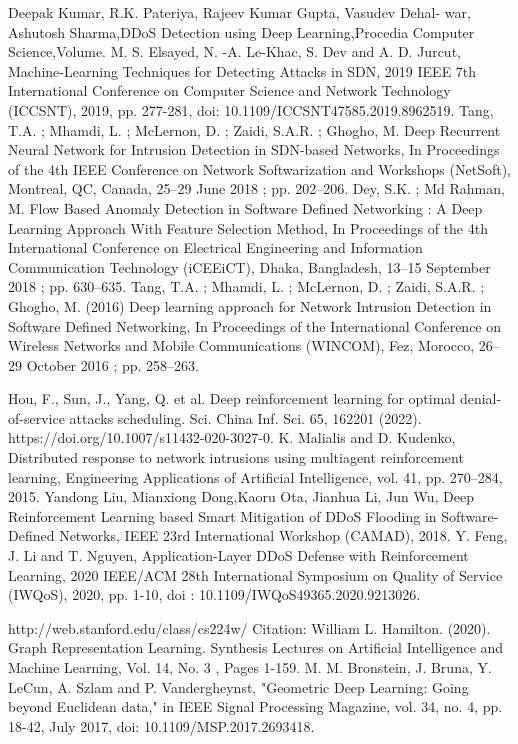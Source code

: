 \begin{thebibliography}{00}
 Deepak Kumar, R.K. Pateriya, Rajeev Kumar Gupta, Vasudev Dehal-
war, Ashutosh Sharma,DDoS Detection using Deep Learning,Procedia
Computer Science,Volume.
M. S. Elsayed, N. -A. Le-Khac, S. Dev and A. D. Jurcut,
Machine-Learning Techniques for Detecting Attacks in SDN, 2019
IEEE 7th International Conference on Computer Science and Network Technology (ICCSNT), 2019, pp. 277-281, doi: 10.1109/ICCSNT47585.2019.8962519.
 Tang, T.A. ; Mhamdi, L. ; McLernon, D. ; Zaidi, S.A.R. ; Ghogho, M. Deep Recurrent Neural Network for Intrusion Detection in
SDN-based Networks, In Proceedings of the 4th IEEE Conference on Network Softwarization and Workshops (NetSoft), Montreal, QC,
Canada, 25–29 June 2018 ; pp. 202–206.
 Dey, S.K. ; Md Rahman, M. Flow Based Anomaly Detection in Software Defined Networking : A Deep Learning Approach With
Feature Selection Method, In Proceedings of the 4th International Conference on Electrical Engineering and Information Communication
Technology (iCEEiCT), Dhaka, Bangladesh, 13–15 September 2018 ; pp. 630–635.
 Tang, T.A. ; Mhamdi, L. ; McLernon, D. ; Zaidi, S.A.R. ; Ghogho, M. (2016) Deep learning approach for Network Intrusion Detection
in Software Defined Networking, In Proceedings of the International Conference on Wireless Networks and Mobile Communications
(WINCOM), Fez, Morocco, 26–29 October 2016 ; pp. 258–263.

Hou, F., Sun, J., Yang, Q. et al. Deep reinforcement learning for optimal denial-of-service attacks scheduling. Sci. China Inf. Sci. 65, 162201 (2022). https://doi.org/10.1007/s11432-020-3027-0.
 K. Malialis and D. Kudenko, Distributed response to network intrusions using multiagent reinforcement learning, Engineering
Applications of Artificial Intelligence, vol. 41, pp. 270–284, 2015.
 Yandong Liu, Mianxiong Dong,Kaoru Ota, Jianhua Li, Jun Wu, Deep Reinforcement Learning based Smart Mitigation of DDoS Flooding
in Software-Defined Networks, IEEE 23rd International Workshop (CAMAD), 2018.
 Y. Feng, J. Li and T. Nguyen, Application-Layer DDoS Defense with Reinforcement Learning, 2020 IEEE/ACM 28th International
Symposium on Quality of Service (IWQoS), 2020, pp. 1-10, doi : 10.1109/IWQoS49365.2020.9213026.



 
http://web.stanford.edu/class/cs224w/
 Citation: William L. Hamilton. (2020). Graph Representation Learning. Synthesis Lectures on Artificial Intelligence and Machine Learning, Vol. 14, No. 3 , Pages 1-159.
M. M. Bronstein, J. Bruna, Y. LeCun, A. Szlam and P. Vandergheynst, "Geometric Deep Learning: Going beyond Euclidean data," in IEEE Signal Processing Magazine, vol. 34, no. 4, pp. 18-42, July 2017, doi: 10.1109/MSP.2017.2693418. 


\end{thebibliography}
